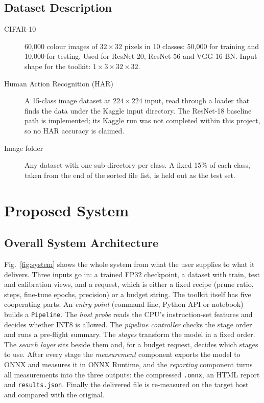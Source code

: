 \documentclass[oneside,a4paper,12pt]{report}
\newcommand{\code}[1]{\texttt{\small #1}}
\begin{document}
\section{Dataset Description}
\begin{description}
\item[CIFAR-10~\cite{krizhevsky2009}] 60,000 colour images of $32\times32$ pixels in 10 classes: 50,000 for training and 10,000 for testing. Used for ResNet-20, ResNet-56 and VGG-16-BN. Input shape for the toolkit: $1\times3\times32\times32$.
\item[Human Action Recognition (HAR)] A 15-class image dataset at $224\times224$ input, read through a loader that finds the data under the Kaggle input directory. The ResNet-18 baseline path is implemented; its Kaggle run was not completed within this project, so no HAR accuracy is claimed.
\item[Image folder] Any dataset with one sub-directory per class. A fixed 15\% of each class, taken from the end of the sorted file list, is held out as the test set.
\end{description}

\chapter{Proposed System}
\section{Overall System Architecture}
Fig.~\ref{fig:system} shows the whole system from what the user supplies to what it delivers. Three inputs go in: a trained FP32 checkpoint, a dataset with train, test and calibration views, and a request, which is either a fixed recipe (prune ratio, steps, fine-tune epochs, precision) or a budget string. The toolkit itself has five cooperating parts. An \emph{entry point} (command line, Python API or notebook) builds a \code{Pipeline}. The \emph{host probe} reads the CPU's instruction-set features and decides whether INT8 is allowed. The \emph{pipeline controller} checks the stage order and runs a pre-flight summary. The \emph{stages} transform the model in a fixed order. The \emph{search layer} sits beside them and, for a budget request, decides which stages to use. After every stage the \emph{measurement} component exports the model to ONNX and measures it in ONNX Runtime, and the \emph{reporting} component turns all measurements into the three outputs: the compressed \code{.onnx}, an HTML report and \code{results.json}. Finally the delivered file is re-measured on the target host and compared with the original.
\end{document}
